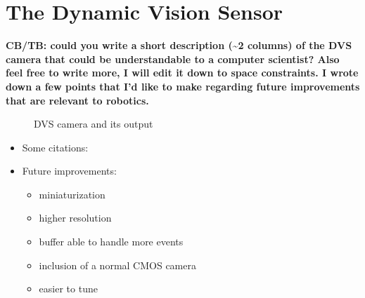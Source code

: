 
\section{The Dynamic Vision Sensor\label{sec:The-DVS-camera}}

\textbf{CB/TB: could you write a short description (\textasciitilde{}2
columns) of the DVS camera that could be understandable to a computer
scientist? Also feel free to write more, I will edit it down to space
constraints. I wrote down a few points that I'd like to make regarding
future improvements that are relevant to robotics.}

\begin{figure}[b]
\hfill{}\hfill{}\hfill{}\hfill{}

\caption{\label{fig:DVS-camera}DVS camera and its output}
\end{figure}


\lorem

\lorem

\lorem

\lorem

\lorem

\lorem

\lorem

\lorem

\lorem
\begin{itemize}
\item Some citations: \cite{boerlin09getting}\cite{lichtsteiner08asynchronous}\cite{etienne-cummings99intelligent}\cite{oster08quantification}
\item Future improvements:

\begin{itemize}
\item miniaturization
\item higher resolution
\item buffer able to handle more events
\item inclusion of a normal CMOS camera
\item easier to tune\end{itemize}
\end{itemize}


